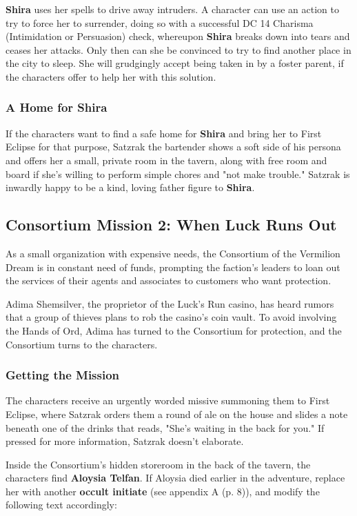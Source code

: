 \documentclass[letterpaper, 11pt, bg=full, twocolumn]{dndbook}
\begin{document}
\textbf{Shira} uses her spells to drive away intruders. A character can use an action to try to force her to surrender, doing so with a successful DC 14 Charisma (Intimidation or Persuasion) check, whereupon \textbf{Shira} breaks down into tears and ceases her attacks. Only then can she be convinced to try to find another place in the city to sleep. She will grudgingly accept being taken in by a foster parent, if the characters offer to help her with this solution.

\subsubsection{A Home for Shira}

If the characters want to find a safe home for \textbf{Shira} and bring her to First Eclipse for that purpose, Satzrak the bartender shows a soft side of his persona and offers her a small, private room in the tavern, along with free room and board if she's willing to perform simple chores and "not make trouble." Satzrak is inwardly happy to be a kind, loving father figure to \textbf{Shira}.

\subsection{Consortium Mission 2: When Luck Runs Out}

As a small organization with expensive needs, the Consortium of the Vermilion Dream is in constant need of funds, prompting the faction's leaders to loan out the services of their agents and associates to customers who want protection.

Adima Shemsilver, the proprietor of the Luck's Run casino, has heard rumors that a group of thieves plans to rob the casino's coin vault. To avoid involving the Hands of Ord, Adima has turned to the Consortium for protection, and the Consortium turns to the characters.

\subsubsection{Getting the Mission}

The characters receive an urgently worded missive summoning them to First Eclipse, where Satzrak orders them a round of ale on the house and slides a note beneath one of the drinks that reads, "She's waiting in the back for you." If pressed for more information, Satzrak doesn't elaborate.

Inside the Consortium's hidden storeroom in the back of the tavern, the characters find \textbf{Aloysia Telfan}. If Aloysia died earlier in the adventure, replace her with another \textbf{occult initiate} (see appendix A (p. 8)), and modify the following text accordingly:
\end{document}
